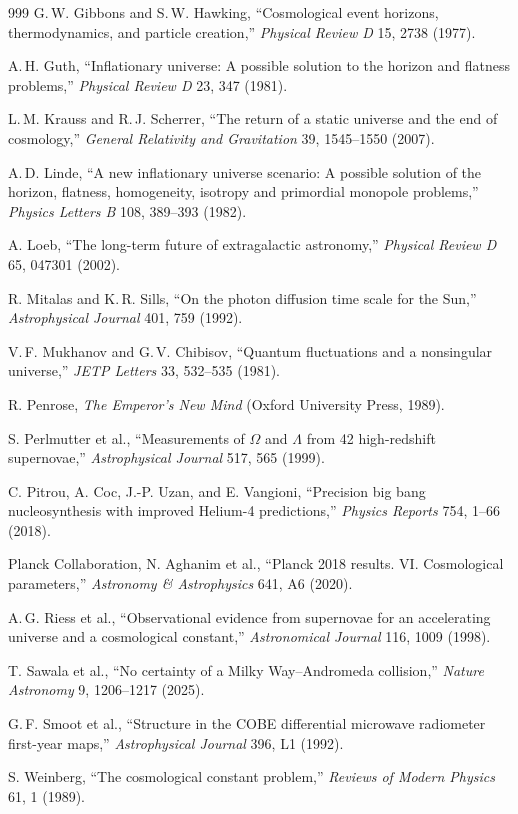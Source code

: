 \begin{thebibliography}{999}
 G.\,W. Gibbons and S.\,W. Hawking, ``Cosmological event horizons, thermodynamics, and particle creation,'' \textit{Physical Review D} 15, 2738 (1977).

 A.\,H. Guth, ``Inflationary universe: A possible solution to the horizon and flatness problems,'' \textit{Physical Review D} 23, 347 (1981).

 L.\,M. Krauss and R.\,J. Scherrer, ``The return of a static universe and the end of cosmology,'' \textit{General Relativity and Gravitation} 39, 1545--1550 (2007).

 A.\,D. Linde, ``A new inflationary universe scenario: A possible solution of the horizon, flatness, homogeneity, isotropy and primordial monopole problems,'' \textit{Physics Letters B} 108, 389--393 (1982).

 A. Loeb, ``The long-term future of extragalactic astronomy,'' \textit{Physical Review D} 65, 047301 (2002).

 R. Mitalas and K.\,R. Sills, ``On the photon diffusion time scale for the Sun,'' \textit{Astrophysical Journal} 401, 759 (1992).

 V.\,F. Mukhanov and G.\,V. Chibisov, ``Quantum fluctuations and a nonsingular universe,'' \textit{JETP Letters} 33, 532--535 (1981).

 R. Penrose, \textit{The Emperor's New Mind} (Oxford University Press, 1989).

 S. Perlmutter et al., ``Measurements of \(\Omega\) and \(\Lambda\) from 42 high-redshift supernovae,'' \textit{Astrophysical Journal} 517, 565 (1999).

 C. Pitrou, A. Coc, J.-P. Uzan, and E. Vangioni, ``Precision big bang nucleosynthesis with improved Helium-4 predictions,'' \textit{Physics Reports} 754, 1--66 (2018).

 Planck Collaboration, N. Aghanim et al., ``Planck 2018 results. VI. Cosmological parameters,'' \textit{Astronomy \& Astrophysics} 641, A6 (2020).

 A.\,G. Riess et al., ``Observational evidence from supernovae for an accelerating universe and a cosmological constant,'' \textit{Astronomical Journal} 116, 1009 (1998).

 T. Sawala et al., ``No certainty of a Milky Way--Andromeda collision,'' \textit{Nature Astronomy} 9, 1206--1217 (2025).

 G.\,F. Smoot et al., ``Structure in the COBE differential microwave radiometer first-year maps,'' \textit{Astrophysical Journal} 396, L1 (1992).

 S. Weinberg, ``The cosmological constant problem,'' \textit{Reviews of Modern Physics} 61, 1 (1989).

\end{thebibliography}
